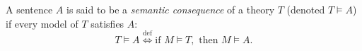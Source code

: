 

\setcounter{section}{3}
\setcounter{subsection}{1}
\setcounter{dfn}{10}

\begin{dfn}
A sentence $A$ is said to be a \emph{semantic consequence} of a theory $T$ (denoted $T \vDash A$) if every model of $T$ satisfies $A$:
\[
T \vDash A \stackrel{\mathrm{def}}{\Longleftrightarrow} \text{if } M \vDash T, \text{ then } M \vDash A.
\]
\end{dfn}

